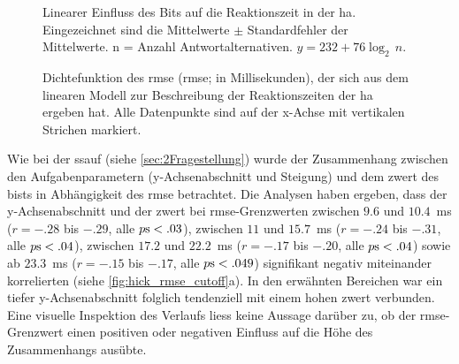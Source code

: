 \documentclass[11pt, twoside, a4paper]{book}		%
\begin{document}
\begin{figure}[t]
	\centering
	\begin{adjustbox}{width=1\textwidth}
		
	\end{adjustbox}
	\caption[Lineares Modell zur Vorhersage der Reaktionszeit durch das Bit der \gls{ha}]{Linearer Einfluss des Bits auf die Reaktionszeit in der \gls{ha}. Eingezeichnet sind die Mittelwerte $\pm$ Standardfehler der Mittelwerte. n = Anzahl Antwortalternativen. $y = 232 + 76\log_{2}\,n$.}
	\label{fig:hick_linear_model}
\end{figure}




\begin{figure}[t]
	\centering
	\begin{adjustbox}{width=1\textwidth}
		
	\end{adjustbox}
	\caption[Dichtefunktion des aus der \gls{ha} mit einer linearen Regression abgeleiteten \gls{rmse}]{Dichtefunktion des \acrlong{rmse} (\gls{rmse}; in Millisekunden), der sich aus dem linearen Modell zur Beschreibung der Reaktionszeiten der \gls{ha} ergeben hat. Alle Datenpunkte sind auf der x-Achse mit vertikalen Strichen markiert.}
	\label{fig:hick_rmse_density}
\end{figure}


Wie bei der \gls{ssauf} (siehe \autoref{sec:2Fragestellung}) wurde der Zusammenhang zwischen den Aufgabenparametern (y-Ach\-sen\-ab\-schnitt und Steigung) und dem \gls{zwert} des \gls{bist}s in Abhängigkeit des \gls{rmse} betrachtet. Die Analysen haben ergeben, dass der y-Ach\-sen\-ab\-schnitt und der \gls{zwert} bei \gls{rmse}-Grenzwerten zwischen $9.6$ und $10.4$~ms ($r = -.28$ bis $ -.29$, alle $p\textnormal{s} < .03$), zwischen $11$ und $15.7$~ms ($r = -.24$ bis $ -.31$, alle $p\textnormal{s} < .04$), zwischen $17.2$ und $22.2$~ms ($r = -.17$ bis $ -.20$, alle $p\textnormal{s} < .04$) sowie ab $23.3$~ms ($r = -.15$ bis $ -.17$, alle $p\textnormal{s} < .049$) signifikant negativ miteinander  korrelierten (siehe \autoref{fig:hick_rmse_cutoff}a). In den erwähnten Bereichen war ein tiefer y-Ach\-sen\-ab\-schnitt folglich tendenziell mit einem hohen \gls{zwert} verbunden. Eine visuelle Inspektion des Verlaufs liess keine Aussage darüber zu, ob der \gls{rmse}-Grenzwert einen positiven oder negativen Einfluss auf die Höhe des Zusammenhangs ausübte.
\end{document}
